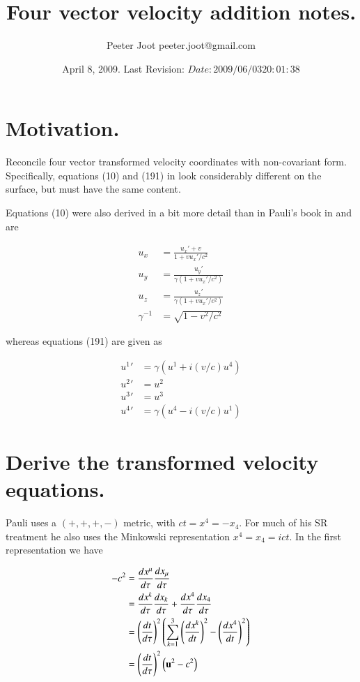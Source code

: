 \documentclass{article}
\title{ Four vector velocity addition notes. }
\author{Peeter Joot \quad peeter.joot@gmail.com }
\date{ April 8, 2009.  Last Revision: $Date: 2009/06/03 20:01:38 $ }
\begin{document}
\maketitle{}
\tableofcontents
\section{Motivation. }

Reconcile four vector transformed velocity coordinates with non-covariant form.
Specifically, equations (10) and (191) in \cite{pauli1981tr} look considerably
different on the surface, but must have the same content.

Equations (10) were also derived in a bit more detail than in Pauli's book in
\cite{PJpauliVelocityAddition} and are

\begin{align}\label{eqn:eqn10}
u_x &= \frac{ {u_x}' + v  }{ 1 + v {u_x}'/c^2} \\
u_y &= \frac{{u_y}'}{\gamma (1 + v {u_x}'/c^2)} \\
u_z &= \frac{{u_z}'}{\gamma (1 + v {u_x}'/c^2)} \\
\gamma^{-1} &= \sqrt{ 1 - v^2/c^2}
\end{align}

whereas equations (191) are given as

\begin{align}\label{eqn:eqn191}
{u^1}' &= \gamma ( u^1 + i (v/c) u^4) \\
{u^2}' &= {u^2} \\
{u^3}' &= {u^3} \\
{u^4}' &= \gamma ( u^4 - i (v/c) u^1)
\end{align}

\section{Derive the transformed velocity equations. }

Pauli uses a $(+,+,+,-)$ metric, with $ct = x^4 = - x_4$.  For much of his SR treatment he also uses the Minkowski representation $x^4 = x_4 = ict$. In the first representation we have

\begin{align*}
-c^2 
&= \frac{dx^\mu}{d\tau} \frac{dx_\mu}{d\tau} \\
&= \frac{dx^k}{d\tau} \frac{dx_k}{d\tau} + \frac{dx^4}{d\tau} \frac{dx_4}{d\tau} \\
&= \left(\frac{dt}{d\tau}\right)^2 \left( \sum_{k=1}^3 \left(\frac{dx^k}{dt}\right)^2 - \left(\frac{dx^4}{dt}\right)^2 \right) \\
&= \left(\frac{dt}{d\tau}\right)^2 \left( \mathbf{u}^2 - c^2 \right) \\
\end{align*}
\end{document}
